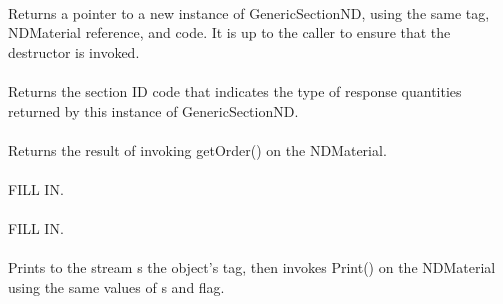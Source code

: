  \\
Returns a pointer to a new instance of GenericSectionND, using the
same tag, NDMaterial reference, and code. It is up to the caller to
ensure that the destructor is invoked. \\

 \\
Returns the section ID code that indicates the type of response quantities
returned by this instance of GenericSectionND. \\

 \\
Returns the result of invoking getOrder() on the NDMaterial. \\

\\
FILL IN. \\

\\
FILL IN. \\

 \\
Prints to the stream \p s the object's \p tag, then invokes
Print() on the NDMaterial using the same values of \p s
and \p flag. \\
